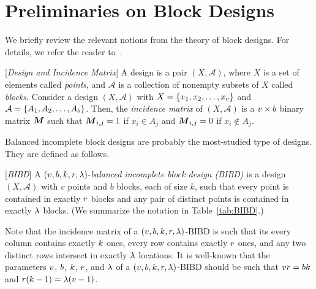 \documentclass[conference,letterpaper]{IEEEtran}
\begin{document}

\section{Preliminaries on Block Designs}
\label{sec:designs}
We briefly review the relevant notions from the theory of block designs. For details, we refer the reader to~\cite{Stinson:2003}.

\begin{definition}
\label{def:bibd}
[{\it Design and Incidence Matrix}] 
A design is a pair $(X,\mathcal{A})$, where $X$ is a set of elements called {\it points}, and $\mathcal{A}$ is a collection of nonempty subsets of $X$ called {\it blocks}. 
Consider a design $(X,\mathcal{A})$ with $X = \{x_1,x_2,\ldots,x_{v}\}$ and $\mathcal{A} = \{A_1,A_2,\ldots,A_{b}\}$. Then, the {\it incidence matrix} of $(X,\mathcal{A})$ is a $v\times b$ binary matrix $\boldsymbol{M}$ such that $\boldsymbol{M}_{i,j} = 1$ if $x_i\in A_j$ and $\boldsymbol{M}_{i,j} = 0$ if $x_i\notin A_j$. %
\end{definition}

Balanced incomplete block designs are probably the most-studied type of designs. They are  defined as follows.
\begin{definition}
\label{def:bibd}
[{\it BIBD}] %
A $(v,b,k,r,\lambda)$-{\it balanced incomplete block design (BIBD)} is a design  $(X,\mathcal{A})$ with $v$ points and $b$ blocks, each of size $k$, such that 
every point is contained in exactly $r$ blocks and any pair of distinct points is contained in exactly $\lambda$ blocks. (We summarize the notation in Table~\ref{tab:BIBD}.)
\end{definition}

\begin{remark}
\label{rem:incidence-matrix}
Note that the incidence matrix of a $(v,b,k,r,\lambda)$-BIBD is such that its every column contains exactly $k$ ones, every row contains exactly $r$ ones, and any two distinct rows intersect in exactly $\lambda$ locations. 
It is well-known that the parameters $v$, $b$, $k$, $r$, and $\lambda$ of a $(v,b,k,r,\lambda)$-BIBD should be such that $vr = bk$ and $r(k-1) = \lambda(v-1)$. 
\end{remark}
\end{document}
